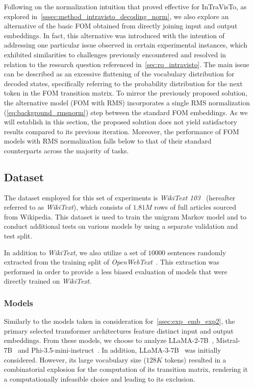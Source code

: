 Following on the normalization intuition that proved effective for InTraVisTo, as explored in~\cref{sssec:method_intravisto_decoding_norm}, we also explore an alternative of the basic FOM obtained from directly joining input and output embeddings.
In fact, this alternative was introduced with the intention of addressing one particular issue observed in certain experimental instances, which exhibited similarities to challenges previously encountered and resolved in relation to the research question referenced in~\cref{sec:rq_intravisto}.
The main issue can be described as an excessive flattening of the vocabulary distribution for decoded states, specifically referring to the probability distribution for the next token in the FOM transition matrix.
To mirror the previously proposed solution, the alternative model (FOM with RMS) incorporates a single RMS normalization (\cref{eq:background_rmsnorm}) step between the standard FOM embeddings.
As we will establish in this section, the proposed solution does not yield satisfactory results compared to its previous iteration.
Moreover, the performance of FOM models with RMS normalization falls below to that of their standard counterparts across the majority of tasks.

\subsection{Dataset}\label{ssec:exp_fom_dataset}

The dataset employed for this set of experiments is \emph{WikiText 103}~\cite{merity2017} (hereafter referred to as \emph{WikiText}), which consists of $1.81M$ rows of full articles sourced from Wikipedia.
This dataset is used to train the unigram Markov model and to conduct additional tests on various models by using a separate validation and test split.

In addition to \emph{WikiText}, we also utilize a set of $10000$ sentences randomly extracted from the training split of \emph{OpenWebText}~\cite{gokaslan2019}.
This extraction was performed in order to provide a less biased evaluation of models that were directly trained on \emph{WikiText}.

\subsubsection{Models}

Similarly to the models taken in consideration for~\cref{ssec:exp_emb_exp2}, the primary selected transformer architectures feature distinct input and output embeddings.
From these models, we choose to analyze LLaMA-2-7B~\cite{touvron2023}, Mistral-7B~\cite{jiang2023} and Phi-3.5-mini-instruct~\cite{abdin2024}.
In addition, LLaMA-3-7B~\cite{dubey2024} was initially considered.
However, its large vocabulary size ($128K$ tokens) resulted in a combinatorial explosion for the computation of its transition matrix, rendering it a computationally infeasible choice and leading to its exclusion.

